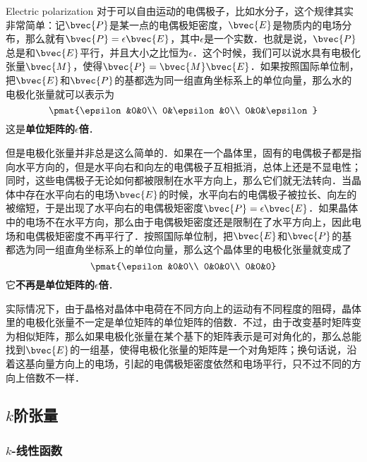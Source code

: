 \begin{example}{Electric polarization}
对于可以自由运动的电偶极子，比如水分子，这个规律其实非常简单：记$\bvec{P}$是某一点的电偶极矩密度，$\bvec{E}$是物质内的电场分布，那么就有$\bvec{P}=\epsilon\bvec{E}$，其中$\epsilon$是一个实数．也就是说，$\bvec{P}$总是和$\bvec{E}$平行，并且大小之比恒为$\epsilon$．这个时候，我们可以说水具有电极化张量$\bvec{M}$，使得$\bvec{P}=\bvec{M}\bvec{E}$．如果按照国际单位制，把$\bvec{E}$和$\bvec{P}$的基都选为同一组直角坐标系上的单位向量，那么水的电极化张量就可以表示为
\begin{equation}
\pmat{\epsilon&0&0\\ 0&\epsilon&0\\ 0&0&\epsilon}
\end{equation}
这是\textbf{单位矩阵的$\epsilon$倍}．

但是电极化张量并非总是这么简单的．如果在一个晶体里，固有的电偶极子都是指向水平方向的，但是水平向右和向左的电偶极子互相抵消，总体上还是不显电性；同时，这些电偶极子无论如何都被限制在水平方向上，那么它们就无法转向．当晶体中存在水平向右的电场$\bvec{E}$的时候，水平向右的电偶极子被拉长、向左的被缩短，于是出现了水平向右的电偶极矩密度$\bvec{P}=\epsilon\bvec{E}$．如果晶体中的电场不在水平方向，那么由于电偶极矩密度还是限制在了水平方向上，因此电场和电偶极矩密度不再平行了．按照国际单位制，把$\bvec{E}$和$\bvec{P}$的基都选为同一组直角坐标系上的单位向量，那么这个晶体里的电极化张量就变成了
\begin{equation}
\pmat{\epsilon&0&0\\ 0&0&0\\ 0&0&0}
\end{equation}
它\textbf{不再是单位矩阵的$\epsilon$倍}．

实际情况下，由于晶格对晶体中电荷在不同方向上的运动有不同程度的阻碍，晶体里的电极化张量不一定是单位矩阵的单位矩阵的倍数．不过，由于改变基时矩阵变为相似矩阵，那么如果电极化张量在某个基下的矩阵表示是可对角化的，那么总能找到$\bvec{E}$的一组基，使得电极化张量的矩阵是一个对角矩阵；换句话说，沿着这基向量方向上的电场，引起的电偶极矩密度依然和电场平行，只不过不同的方向上倍数不一样．

\end{example}


\subsection{$k$阶张量}

\subsubsection{$k$-线性函数}

